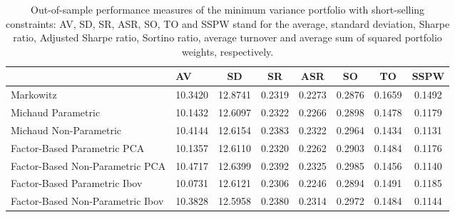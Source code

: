 \begin{table}

\caption{\label{tab:ssc_mvp}Out-of-sample performance measures of the minimum variance portfolio with short-selling constraints: AV, SD, SR, ASR, SO, TO and SSPW stand for the average, standard deviation, Sharpe ratio, Adjusted Sharpe ratio, Sortino ratio, average turnover and average sum of squared portfolio weights, respectively.}
\centering
\begin{tabular}[t]{l|l|c|c|c|c|c|c}
\hline
  & AV & SD & SR & ASR & SO & TO & SSPW\\
\hline
Markowitz & 10.3420 & 12.8741 & 0.2319 & 0.2273 & 0.2876 & 0.1659 & 0.1492\\
\hline
Michaud Parametric & 10.1432 & 12.6097 & 0.2322 & 0.2266 & 0.2898 & 0.1478 & 0.1179\\
\hline
Michaud Non-Parametric & 10.4144 & 12.6154 & 0.2383 & 0.2322 & 0.2964 & 0.1434 & 0.1131\\
\hline
Factor-Based Parametric PCA & 10.1357 & 12.6110 & 0.2320 & 0.2262 & 0.2903 & 0.1484 & 0.1176\\
\hline
Factor-Based Non-Parametric PCA & 10.4717 & 12.6399 & 0.2392 & 0.2325 & 0.2985 & 0.1456 & 0.1140\\
\hline
Factor-Based Parametric Ibov & 10.0731 & 12.6121 & 0.2306 & 0.2246 & 0.2894 & 0.1491 & 0.1185\\
\hline
Factor-Based Non-Parametric Ibov & 10.3828 & 12.5958 & 0.2380 & 0.2314 & 0.2972 & 0.1484 & 0.1144\\
\hline
\end{tabular}
\end{table}
